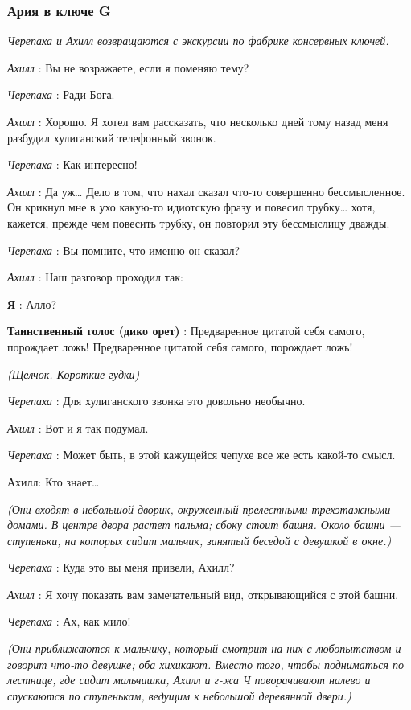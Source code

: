 \subsubsection{Ария в ключе G}

\emph{Черепаха и Ахилл возвращаются с экскурсии по фабрике консервных ключей.}

\emph{Ахилл} : Вы не возражаете, если я поменяю тему?

\emph{Черепаха} : Ради Бога.

\emph{Ахилл} : Хорошо. Я хотел вам рассказать, что несколько дней тому назад меня разбудил хулиганский телефонный звонок.

\emph{Черепаха} : Как интересно!

\emph{Ахилл} : Да уж\ldots{} Дело в том, что нахал сказал что-то совершенно бессмысленное. Он крикнул мне в ухо какую-то идиотскую фразу и повесил трубку\ldots{} хотя, кажется, прежде чем повесить трубку, он повторил эту бессмыслицу дважды.

\emph{Черепаха} : Вы помните, что именно он сказал?

\emph{Ахилл} : Наш разговор проходил так:

\textbf{Я} : Алло?

\textbf{Таинственный голос (дико орет)} : Предваренное цитатой себя самого, порождает ложь! Предваренное цитатой себя самого, порождает ложь!

\emph{(Щелчок. Короткие гудки)}

\emph{Черепаха} : Для хулиганского звонка это довольно необычно.

\emph{Ахилл} : Вот и я так подумал.

\emph{Черепаха} : Может быть, в этой кажущейся чепухе все же есть какой-то смысл.

Ахилл: Кто знает\ldots{}

\emph{(Они входят в небольшой дворик, окруженный прелестными трехэтажными домами. В центре двора растет пальма; сбоку стоит башня. Около башни --- ступеньки, на которых сидит мальчик, занятый беседой с девушкой в окне.)}

\emph{Черепаха} : Куда это вы меня привели, Ахилл?

\emph{Ахилл} : Я хочу показать вам замечательный вид, открывающийся с этой башни.

\emph{Черепаха} : Ах, как мило!

\emph{(Они приближаются к мальчику, который смотрит на них с любопытством и говорит что-то девушке; оба хихикают. Вместо того, чтобы подниматься по лестнице, где сидит мальчишка, Ахилл и г-жа Ч поворачивают налево и спускаются по ступенькам, ведущим к небольшой деревянной двери.)}

